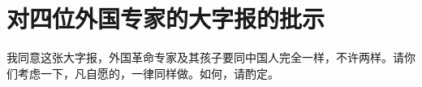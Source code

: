 \section[对四位外国专家的大字报的批示（一九六六年八月二十九日）]{对四位外国专家的大字报的批示}


我同意这张大字报，外国革命专家及其孩子要同中国人完全一样，不许两样。请你们考虑一下，凡自愿的，一律同样做。如何，请酌定。

